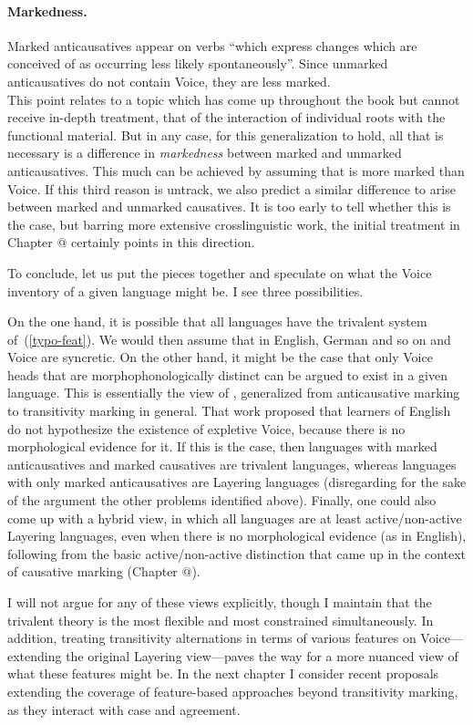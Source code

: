 \paragraph*{Markedness.} Marked anticausatives appear on verbs ``which express changes which are conceived of as occurring less likely spontaneously''. Since unmarked anticausatives do not contain Voice, they are less marked.\\
	This point relates to a topic which has come up throughout the book but cannot receive in-depth treatment, that of the interaction of individual roots with the functional material. But in any case, for this generalization to hold, all that is necessary is a difference in \emph{markedness} between marked and unmarked anticausatives. This much can be achieved by assuming that {\vz} is more marked than Voice. If this third reason is untrack, we also predict a similar difference to arise between marked and unmarked causatives. It is too early to tell whether this is the case, but barring more extensive crosslinguistic work, the initial treatment in Chapter @ certainly points in this direction.

To conclude, let us put the pieces together and speculate on what the Voice inventory of a given language might be. I see three possibilities.

On the one hand, it is possible that all languages have the trivalent system of~(\ref{typo-feat}). We would then assume that in English, German and so on {\vd} and Voice are syncretic. On the other hand, it might be the case that only Voice heads that are morphophonologically distinct can be argued to exist in a given language. This is essentially the view of \cite{layering15}, generalized from anticausative marking to transitivity marking in general. That work proposed that learners of English do not hypothesize the existence of expletive Voice, because there is no morphological evidence for it. If this is the case, then languages with marked anticausatives and marked causatives are trivalent languages, whereas languages with only marked anticausatives are Layering languages (disregarding for the sake of the argument the other problems identified above). Finally, one could also come up with a hybrid view, in which all languages are at least active/non-active Layering languages, even when there is no morphological evidence (as in English), following from the basic active/non-active distinction that came up in the context of causative marking (Chapter @).

I will not argue for any of these views explicitly, though I maintain that the trivalent theory is the most flexible and most constrained simultaneously. In addition, treating transitivity alternations in terms of various features on Voice---extending the original Layering view---paves the way for a more nuanced view of what these features might be. In the next chapter I consider recent proposals extending the coverage of feature-based approaches beyond transitivity marking, as they interact with case and agreement.

